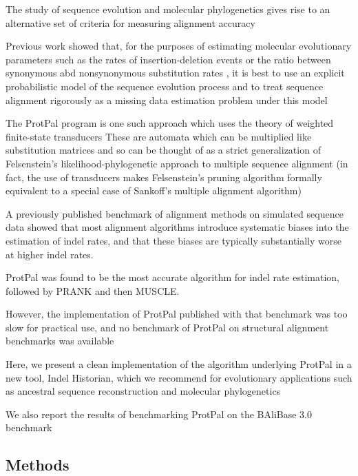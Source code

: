 \documentclass{bioinfo}
\begin{document}
The study of sequence evolution and molecular phylogenetics gives rise to
an alternative set of criteria for measuring alignment accuracy

Previous work showed that, for the purposes of estimating
molecular evolutionary parameters
such as the rates of insertion-deletion events \cite{Westesson2012-zg}
or the ratio between synonymous abd nonsynonymous substitution rates \cite{Redelings},
it is best to use an explicit probabilistic model of the sequence evolution process
and to treat sequence alignment rigorously as a missing data estimation problem
under this model


The ProtPal program is one such approach which uses the theory of
weighted finite-state transducers
These are automata which can be multiplied like substitution matrices
and so can be thought of as a strict generalization of Felsenstein's likelihood-phylogenetic
approach to multiple sequence alignment
(in fact, the use of transducers makes Felsenstein's pruning algorithm formally
equivalent to a special case of Sankoff's multiple alignment algorithm)

A previously published benchmark of alignment methods on simulated sequence data
showed that most alignment algorithms introduce systematic biases into the
estimation of indel rates, and that these biases are typically substantially worse
at higher indel rates.

ProtPal was found to be the most accurate algorithm for indel rate estimation,
followed by PRANK and then MUSCLE.

However, the implementation of ProtPal published with that benchmark was too slow
for practical use, and no benchmark of ProtPal on structural alignment benchmarks was available

Here, we present a clean implementation of the algorithm underlying ProtPal
in a new tool, Indel Historian, which we recommend for evolutionary applications such
as ancestral sequence reconstruction and molecular phylogenetics

We also report the results of benchmarking ProtPal on the BAliBase 3.0 benchmark

\begin{methods}
\section{Methods}

\cite{Westesson2012-zg}

\end{methods}
\end{document}
